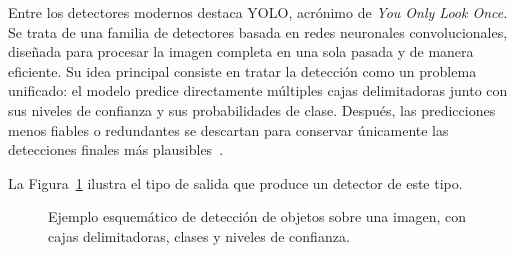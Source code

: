Entre los detectores modernos destaca YOLO, acrónimo de \textit{You Only Look Once}. Se trata de una familia de detectores basada en redes neuronales convolucionales, diseñada para procesar la imagen completa en una sola pasada y de manera eficiente. Su idea principal consiste en tratar la detección como un problema unificado: el modelo predice directamente múltiples cajas delimitadoras junto con sus niveles de confianza y sus probabilidades de clase. Después, las predicciones menos fiables o redundantes se descartan para conservar únicamente las detecciones finales más plausibles~\cite{redmon2016yolo}. 

La Figura~\ref{fig:deteccion-objetos} ilustra el tipo de salida que produce un detector de este tipo.

\vspace{0.5cm}
\begin{figure}[H]
    \centering
    \caption{Ejemplo esquemático de detección de objetos sobre una imagen, con cajas delimitadoras, clases y niveles de confianza.}
    \label{fig:deteccion-objetos}
\end{figure}

